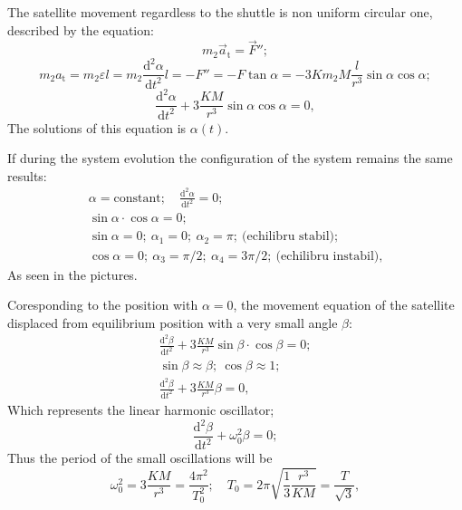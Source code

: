 \begin{description}
  The satellite movement regardless to the shuttle is non uniform circular
  one, described by the equation:
  \[
    m_2\vec a_{\mathrm{t}} = \vec F'';
  \]
  \[
    m_2a_{\mathrm{t}} = m_2\varepsilon l
      = m_2\frac{\mathrm{d}^2\alpha}{\mathrm{d}t^2}l
      = -F'' = -F\tan\alpha
      = -3Km_2M\frac{l}{r^3}\sin\alpha\cos\alpha;
  \]
  \[
    \frac{\mathrm{d}^2\alpha}{\mathrm{d}t^2}
      + 3\frac{KM}{r^3}\sin\alpha\cos\alpha = 0,
  \]
  The solutions of this equation is $\alpha(t)$. %

  If during the system evolution the configuration of the system remains the
  same results:
  \begin{gather*}
    \alpha = \text{constant};\quad
      \frac{\mathrm{d}^2\alpha}{\mathrm{d}t^2} = 0; \\
    \sin\alpha\cdot\cos\alpha = 0; \\
    \sin\alpha = 0;\ \alpha_1 = 0;\ \alpha_2 = \pi;\
      \text{(echilibru stabil);} \\ %
    \cos\alpha = 0;\ \alpha_3 = \pi/2;\ \alpha_4 = 3\pi/2;\
      \text{(echilibru instabil),} %
  \end{gather*}
  As seen in the pictures.


\item[b)] Coresponding to the position with $\alpha = 0$, the movement %
  equation of the satellite displaced from equilibrium position with a very
  small angle $\beta$:
  \begin{gather*}
    \frac{\mathrm{d}^2\beta}{\mathrm{d}t^2}
      + 3\frac{KM}{r^3}\sin\beta\cdot\cos\beta = 0; \\
    \sin\beta \approx \beta;\ \cos\beta \approx 1; \\
    \frac{\mathrm{d}^2\beta}{\mathrm{d}t^2} + 3\frac{KM}{r^3}\beta = 0,
  \end{gather*}
  Which represents the linear harmonic oscillator;
  \[
    \frac{\mathrm{d}^2\beta}{\mathrm{d}t^2} + \omega_0^2\beta = 0;
  \]
  Thus the period of the small oscillations will be
  \[
    \omega_0^2 = 3\frac{KM}{r^3} = \frac{4\pi^2}{T_0^2};\quad
    T_0 = 2\pi\sqrt{\frac{1}{3}\frac{r^3}{KM}} = \frac{T}{\sqrt{3}},
  \]


\end{description}
